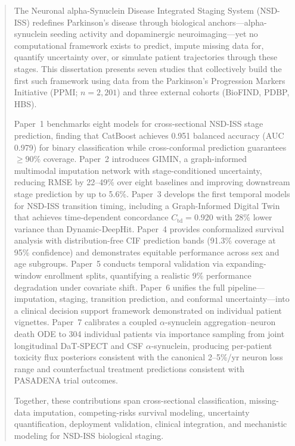 \documentclass[12pt,oneside]{report}
\begin{document}
\begin{abstract}
\noindent
The Neuronal alpha-Synuclein Disease Integrated Staging System (NSD-ISS)
redefines Parkinson's disease through biological anchors---alpha-synuclein
seeding activity and dopaminergic neuroimaging---yet no computational framework
exists to predict, impute missing data for, quantify uncertainty over, or
simulate patient trajectories through these stages. This dissertation presents
seven studies that collectively build the first such framework using data from the
Parkinson's Progression Markers Initiative (PPMI; $n{=}2{,}201$) and three
external cohorts (BioFIND, PDBP, HBS).

Paper~1 benchmarks eight models for cross-sectional NSD-ISS stage prediction,
finding that CatBoost achieves 0.951 balanced accuracy (AUC 0.979) for binary
classification while cross-conformal prediction guarantees ${\geq}90\%$ coverage.
Paper~2 introduces GIMIN, a graph-informed multimodal imputation network with
stage-conditioned uncertainty, reducing RMSE by 22--49\% over eight baselines
and improving downstream stage prediction by up to 5.6\%.
Paper~3 develops the first temporal models for NSD-ISS transition timing,
including a Graph-Informed Digital Twin that achieves time-dependent concordance
$C_\text{td}{=}0.920$ with 28\% lower variance than Dynamic-DeepHit.
Paper~4 provides conformalized survival analysis with distribution-free CIF
prediction bands (91.3\% coverage at 95\% confidence) and demonstrates
equitable performance across sex and age subgroups.
Paper~5 conducts temporal validation via expanding-window enrollment splits,
quantifying a realistic 9\% performance degradation under covariate shift.
Paper~6 unifies the full pipeline---imputation, staging, transition prediction,
and conformal uncertainty---into a clinical decision support framework
demonstrated on individual patient vignettes.
Paper~7 calibrates a coupled $\alpha$-synuclein aggregation--neuron death ODE
to 304 individual patients via importance sampling from joint longitudinal
DaT-SPECT and CSF $\alpha$-synuclein, producing per-patient toxicity flux
posteriors consistent with the canonical 2--5\%/yr neuron loss range and
counterfactual treatment predictions consistent with PASADENA trial outcomes.

Together, these contributions span cross-sectional classification, missing-data
imputation, competing-risks survival modeling, uncertainty quantification,
deployment validation, clinical integration, and mechanistic modeling for
NSD-ISS biological staging.
\end{abstract}
\end{document}
